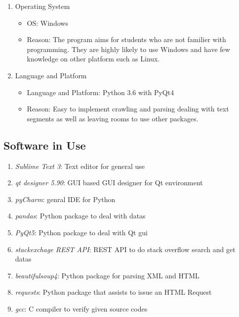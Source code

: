 \documentclass[conference]{IEEEtran}
\begin{document}
\begin{itemize}
\begin{itemize}
\begin{itemize}
\begin{itemize}
\begin{enumerate}
  \item Operating System
  \begin{itemize}
    \item OS: Windows
    \item Reason: The program aims for students who are not familier with programming. They are highly likely to use Windows and have few knowledge on other platform such as Linux.
  \end{itemize}
  \item Language and Platform
  \begin{itemize}
    \item Language and Platform: Python 3.6 with PyQt4
    \item Reason: Easy to implement crawling and parsing dealing with text segments as well as leaving rooms to use other packages.
  \end{itemize}
\end{enumerate}
\textit{}


\subsection{Software in Use} %
\label{sub:software_in_use}

\begin{enumerate}
  \item \textit{Sublime Text 3}: Text editor for general use
  \item \textit{qt designer 5.90}: GUI based GUI designer for Qt environment
  \item \textit{pyCharm}: genral IDE for Python
  \item \textit{pandas}: Python package to deal with datas
  \item \textit{PyQt5}: Python package to deal with Qt gui
  \item \textit{stackexchage REST API}: REST API to do stack overflow search and get datas
  \item \textit{beautifulsoup4}: Python package for parsing XML and HTML
  \item \textit{requests}: Python package that assists to issue an HTML Request
  \item \textit{gcc}: C compiler to verify given source codes
\end{enumerate}
\textit{}



\end{itemize}
\end{itemize}
\end{itemize}
\end{itemize}
\end{document}
